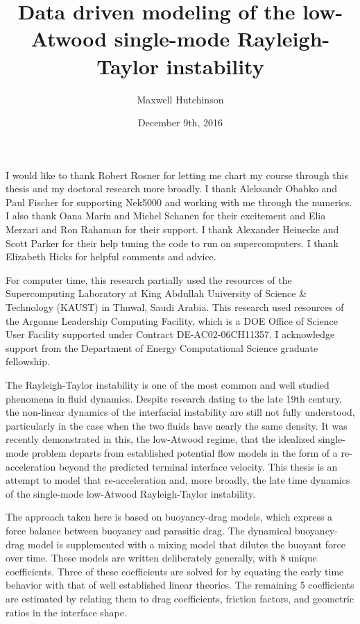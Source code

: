 \documentclass{ucetd}
\title{Data driven modeling of the low-Atwood single-mode Rayleigh-Taylor instability}
\author{Maxwell Hutchinson}
\date{December 9th, 2016}
\begin{document}
\maketitle

\makecopyright
\makededication


\tableofcontents
\listoffigures
\listoftables

\acknowledgments

I would like to thank Robert Rosner for letting me chart my course through this thesis and my doctoral research more broadly.
I thank Aleksandr Obabko and Paul Fischer for supporting Nek5000 and working with me through the numerics.
I also thank Oana Marin and Michel Schanen for their excitement and Elia Merzari and Ron Rahaman for their support.
I thank Alexander Heinecke and Scott Parker for their help tuning the code to run on supercomputers.
I thank Elizabeth Hicks for helpful comments and advice.

For computer time, this research partially used the resources of the
Supercomputing Laboratory at King Abdullah University of Science \& Technology
 (KAUST) in Thuwal, Saudi Arabia.
This research used resources of the Argonne Leadership Computing Facility, which
is a DOE Office of Science User Facility supported under Contract DE-AC02-06CH11357.
I acknowledge support from the Department of Energy Computational Science graduate fellowship.

\abstract

The Rayleigh-Taylor instability is one of the most common and well studied phenomena in fluid dynamics.
Despite research dating to
the late 19th century, the non-linear dynamics
of the interfacial instability are still not fully understood, particularly in the case when the two fluids have nearly the same density.
It was recently demonstrated in this, the low-Atwood regime, that the idealized single-mode problem departs from established potential flow models in the form of a re-acceleration beyond the predicted terminal interface velocity.
This thesis is an attempt to model that re-acceleration and, more broadly, the late time dynamics of the single-mode low-Atwood Rayleigh-Taylor instability.

The approach taken here is based on buoyancy-drag models, which express a force balance between buoyancy and parasitic drag.
The dynamical buoyancy-drag model is supplemented with a mixing model that dilutes the buoyant force over time.
These models are written deliberately generally, with 8 unique coefficients.
Three of these coefficients are solved for by equating the early time behavior with that of well established linear theories.
The remaining 5 coefficients are estimated by relating them to drag coefficients, friction factors, and geometric ratios in the interface shape.
\end{document}
